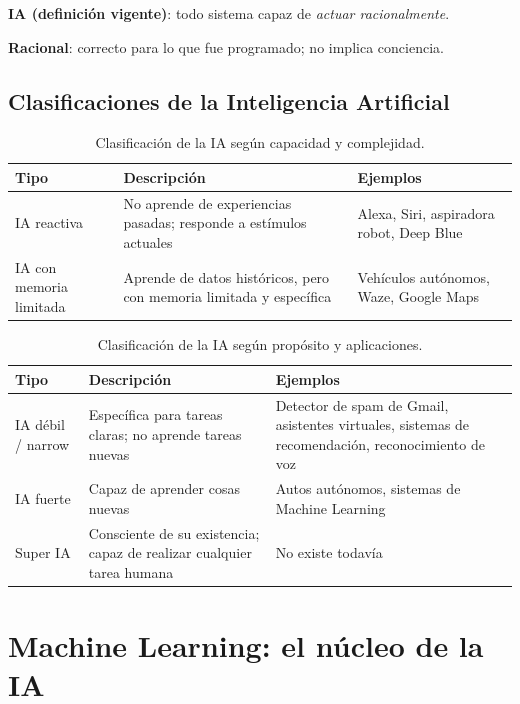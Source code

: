 \begin{definicion}
\textbf{IA (definición vigente)}: todo sistema capaz de \emph{actuar racionalmente}.

\textbf{Racional}: correcto para lo que fue programado; no implica conciencia.
\end{definicion}

\subsection{Clasificaciones de la Inteligencia Artificial}

\begin{table}[H]
\centering
\caption{Clasificación de la IA según capacidad y complejidad.}
\label{tab:ia-capacidad}
\small
\begin{tabularx}{\textwidth}{@{}lXX@{}}
\toprule
\textbf{Tipo} & \textbf{Descripción} & \textbf{Ejemplos} \\
\midrule
IA reactiva & No aprende de experiencias pasadas; responde a estímulos actuales & Alexa, Siri, aspiradora robot, Deep Blue \\
IA con memoria limitada & Aprende de datos históricos, pero con memoria limitada y específica & Vehículos autónomos, Waze, Google Maps \\
\bottomrule
\end{tabularx}
\end{table}

\begin{table}[H]
\centering
\caption{Clasificación de la IA según propósito y aplicaciones.}
\label{tab:ia-proposito}
\small
\begin{tabularx}{\textwidth}{@{}lXX@{}}
\toprule
\textbf{Tipo} & \textbf{Descripción} & \textbf{Ejemplos} \\
\midrule
IA débil / narrow & Específica para tareas claras; no aprende tareas nuevas & Detector de spam de Gmail, asistentes virtuales, sistemas de recomendación, reconocimiento de voz \\
IA fuerte & Capaz de aprender cosas nuevas & Autos autónomos, sistemas de Machine Learning \\
Super IA & Consciente de su existencia; capaz de realizar cualquier tarea humana & No existe todavía \\
\bottomrule
\end{tabularx}
\end{table}

\section{Machine Learning: el núcleo de la IA}

